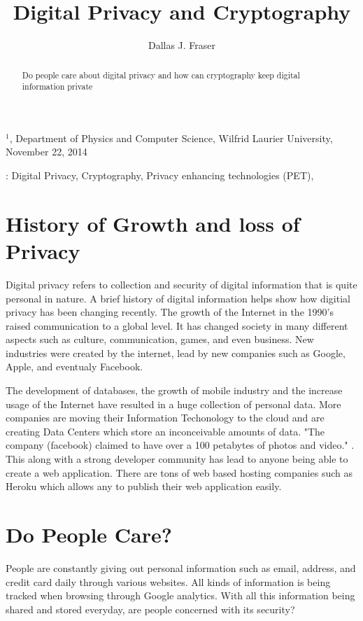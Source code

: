 \documentclass[12pt]{article}
\title{Digital Privacy and Cryptography}
\author{
	Dallas J. Fraser\inst{1}
}
\def\inst#1{$^{#1}$}
\begin{document}
\maketitle

\begin{center}
{\footnotesize

\inst{1}, Department of Physics and Computer Science, Wilfrid Laurier 
University, November 22, 2014}

\end{center}

\begin{abstract}
Do people care about digital privacy and how can cryptography keep digital information private
\end{abstract}

: Digital Privacy, Cryptography, Privacy enhancing technologies (PET),

\clearpage

\section{History of Growth and loss of Privacy}\label{sec:history}


Digital privacy refers to collection and security of digital information that is quite personal in nature. A brief history of digital information helps show how digitial privacy has been changing recently. The growth of the Internet in the 1990's raised communication to a global level. It has changed society in many different aspects such as culture, communication, games, and even business. New industries were created by the internet, lead by new companies such as Google, Apple, and eventualy Facebook.

The development of databases, the growth of mobile industry  and the increase usage of the Internet have resulted in a huge collection of personal data. More companies are moving their Information Techonology to the cloud and are creating Data Centers which store an inconceivable amounts of data. "The company (facebook) claimed to have over a 100 petabytes of photos and video." \cite{Wallbank}. This along with a strong developer community has lead to anyone being able to create a web application. There are tons of web based hosting companies such as Heroku which allows any to publish their web application easily.

\section{Do People Care?}\label{sec:demand}
People are constantly giving out personal information such as email, address, and credit card daily through various websites. All kinds of information is being tracked when browsing through Google analytics. With all this information being shared and stored everyday, are people concerned with its security?
\end{document}
